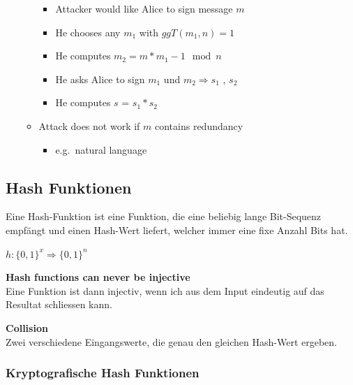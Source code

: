 \begin{itemize}
\begin{itemize}
    \begin{itemize}
    \tightlist
    \item
      Attacker would like Alice to sign message $m$
    \item
      He chooses any $m_1$ with $ggT(m_1 ,n) = 1$
    \item
      He computes $m_2 = m * m_1-1 \mod n$
    \item
      He asks Alice to sign $m_1$ und $m_2 \Rightarrow s_1$ , $s_2$
    \item
      He computes $s$ = $s_1 * s_2$
    \end{itemize}
  \item
    Attack does not work if $m$ contains redundancy

    \begin{itemize}
    \tightlist
    \item
      e.g.~natural language
    \end{itemize}
  \end{itemize}
\end{itemize}

\hypertarget{hash-funktionen}{%
\subsection{Hash Funktionen}\label{hash-funktionen}}

Eine Hash-Funktion ist eine Funktion, die eine beliebig lange
Bit-Sequenz empfängt und einen Hash-Wert liefert, welcher immer eine
fixe Anzahl Bits hat.

\begin{tcolorbox}[colback=red!5!white,colframe=red!75!black]
    $h: \{0,1\}^x \Rightarrow \{0,1\}^n$
\end{tcolorbox}

\textbf{Hash functions can never be injective}\\
Eine Funktion ist dann injectiv, wenn ich aus dem Input eindeutig auf
das Resultat schliessen kann.

\textbf{Collision}\\
Zwei verschiedene Eingangswerte, die genau den gleichen Hash-Wert
ergeben.

\hypertarget{kryptografische-hash-funktionen}{%
\subsubsection{Kryptografische Hash
Funktionen}\label{kryptografische-hash-funktionen}}

